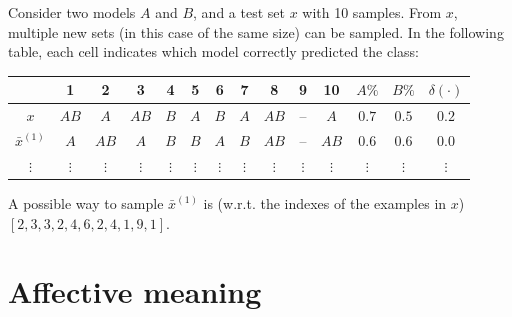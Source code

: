 \begin{description}
        \begin{example}
            Consider two models $A$ and $B$, and a test set $x$ with 10 samples. From $x$, multiple new sets (in this case of the same size) can be sampled. In the following table, each cell indicates which model correctly predicted the class:
            \begin{center}
                \footnotesize
                \begin{tabular}{ccccccccccc|ccc}
                    \toprule
                                    & 1 & 2 & 3 & 4 & 5 & 6 & 7 & 8 & 9 & 10 & $A\%$ & $B\%$ & $\delta(\cdot)$ \\
                    \midrule
                    $x$             & $AB$ & $A$ & $AB$ & $B$ & $A$ & $B$ & $A$ & $AB$ & -- & $A$ & $0.7$ & $0.5$ & $0.2$ \\
                    $\bar{x}^{(1)}$   & $A$ & $AB$ & $A$ & $B$ & $B$ & $A$ & $B$ & $AB$ & -- & $AB$ & $0.6$ & $0.6$ & $0.0$ \\
                    $\vdots$ & $\vdots$ & $\vdots$ & $\vdots$ & $\vdots$ & $\vdots$ & $\vdots$ & $\vdots$ & $\vdots$ & $\vdots$ & $\vdots$ & $\vdots$ & $\vdots$ & $\vdots$ \\
                    \bottomrule
                \end{tabular}
            \end{center}
            A possible way to sample $\bar{x}^{(1)}$ is (w.r.t. the indexes of the examples in $x$) $[2, 3, 3, 2, 4, 6, 2, 4, 1, 9, 1]$.
        \end{example}
\end{description}



\section{Affective meaning} \label{sec:affective_meaning}

